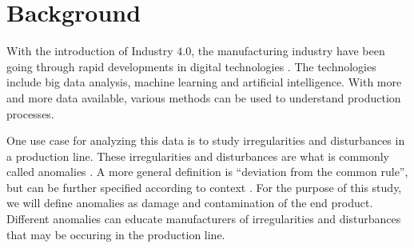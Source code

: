 \section{Background}

With the introduction of Industry $4.0$, the manufacturing industry have been going through rapid developments in digital technologies \cite{industry4}. The technologies include big data analysis, machine learning and artificial intelligence. With more and more data available, various methods can be used to understand production processes. 
\par
One use case for analyzing this data is to study irregularities and disturbances in a production line. These irregularities and disturbances are what is commonly called anomalies \cite{AnomalyDef}. A more general definition is ``deviation from the common rule'', but can be further specified according to context \cite{dictionary}. For the purpose of this study, we will define anomalies as damage and contamination of the end product. Different anomalies can educate manufacturers of irregularities and disturbances that may be occuring in the production line. 
\par
